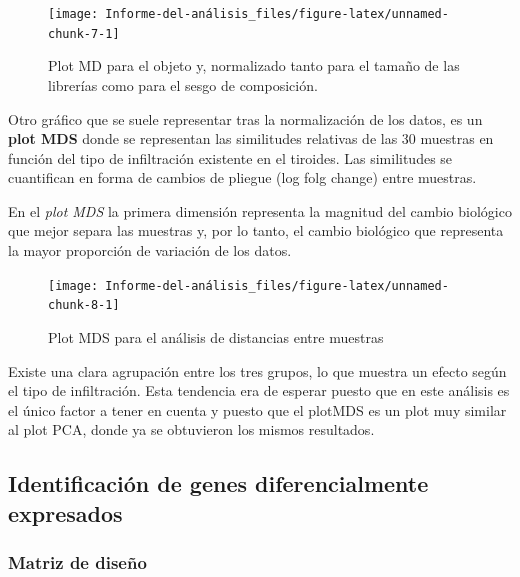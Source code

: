 \documentclass[]{article}
\begin{document}
\begin{figure}[H]

{\centering \texttt{[image: Informe-del-análisis\_files/figure-latex/unnamed-chunk-7-1]} 

}

\caption{Plot MD para el objeto y, normalizado tanto para el tamaño de las librerías como para el sesgo de composición.}\label{fig:unnamed-chunk-7}
\end{figure}

Otro gráfico que se suele representar tras la normalización de los
datos, es un \textbf{plot MDS} donde se representan las similitudes
relativas de las 30 muestras en función del tipo de infiltración
existente en el tiroides. Las similitudes se cuantifican en forma de
cambios de pliegue (log folg change) entre muestras.

En el \emph{plot MDS} la primera dimensión representa la magnitud del
cambio biológico que mejor separa las muestras y, por lo tanto, el
cambio biológico que representa la mayor proporción de variación de los
datos.

\begin{figure}[H]

{\centering \texttt{[image: Informe-del-análisis\_files/figure-latex/unnamed-chunk-8-1]} 

}

\caption{Plot MDS para el análisis de distancias entre muestras}\label{fig:unnamed-chunk-8}
\end{figure}

Existe una clara agrupación entre los tres grupos, lo que muestra un
efecto según el tipo de infiltración. Esta tendencia era de esperar
puesto que en este análisis es el único factor a tener en cuenta y
puesto que el plotMDS es un plot muy similar al plot PCA, donde ya se
obtuvieron los mismos resultados.

\hypertarget{identificaciuxf3n-de-genes-diferencialmente-expresados}{%
\subsection{Identificación de genes diferencialmente
expresados}\label{identificaciuxf3n-de-genes-diferencialmente-expresados}}

\hypertarget{matriz-de-diseuxf1o}{%
\subsubsection{Matriz de diseño}\label{matriz-de-diseuxf1o}}
\end{document}
